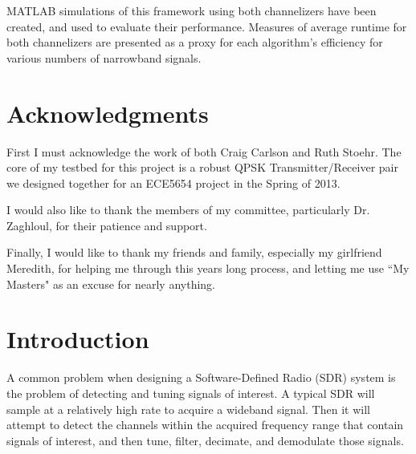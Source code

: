 \documentclass[12pt]{report}
\begin{document}
MATLAB simulations of this framework using both channelizers have been created,
and used to evaluate their performance. Measures of average runtime for both
channelizers are presented as a proxy for each algorithm's efficiency for
various numbers of narrowband signals.


\vfill



\pagebreak

\chapter*{Acknowledgments}
First I must acknowledge the work of both Craig Carlson and Ruth Stoehr.
The core of my testbed for this project is a robust QPSK Transmitter/Receiver
pair we designed together for an ECE5654 project in the Spring of 2013.

I would also like to thank the members of my committee, particularly Dr.
Zaghloul, for their patience and support.

Finally, I would like to thank my friends and family, especially my girlfriend
Meredith, for helping me through this years long process, and letting me use
``My Masters" as an excuse for nearly anything.

\tableofcontents
\pagebreak

\listoffigures
\pagebreak


\pagestyle{myheadings}

\chapter{Introduction}
\label{sec:intro}

A common problem when designing a Software-Defined Radio (SDR) system is the
problem of detecting and tuning signals of interest. A typical SDR will sample
at a relatively high rate to acquire a wideband signal. Then it will attempt to
detect the channels within the acquired frequency range that contain signals of
interest, and then tune, filter, decimate, and demodulate those signals. 
\end{document}
